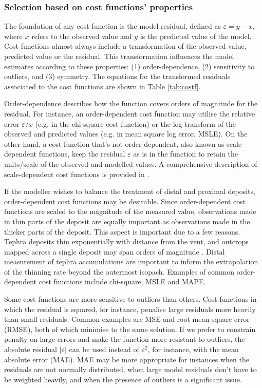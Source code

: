 \subsubsection{Selection based on cost functions' properties} \label{subsection-met-prop}

    The foundation of any cost function is the model residual, defined as $\varepsilon = y - x$, where $x$ refers to the observed value and $y$ is the predicted value of the model. Cost functions almost always include a transformation of the observed value, predicted value or the residual. This transformation influences the model estimates according to these properties: (1) order-dependence, (2) sensitivity to outliers, and (3) symmetry. The equations for the transformed residuals associated to the cost functions are shown in Table \ref{tab:costf}.
    
    Order-dependence describes how the function covers orders of magnitude for the residual. For instance, an order-dependent cost function may utilise the relative error $\varepsilon / x$ (e.g. in the chi-square cost function) or the log-transform of the observed and predicted values (e.g. in mean square log error, MSLE). On the other hand, a cost function that's not order-dependent, also known as scale-dependent functions, keep the residual $\varepsilon$ as is in the function to retain the units/scale of the observed and modelled values. A comprehensive description of scale-dependent cost functions is provided in \cite{walther2005concepts}. 
    
    If the modeller wishes to balance the treatment of distal and proximal deposits, order-dependent cost functions may be desirable. Since order-dependent cost functions are scaled to the magnitude of the measured value, observations made in thin parts of the deposit are equally important as observations made in the thicker parts of the deposit. This aspect is important due to a few reasons. Tephra deposits thin exponentially with distance from the vent, and outcrops mapped across a single deposit may span orders of magnitude \citep{pyle1989thickness}. Distal measurement of tephra accumulations are important to inform the extrapolation of the thinning rate beyond the outermost isopach. Examples of common order-dependent cost functions include chi-square, MSLE and MAPE.
    
    Some cost functions are more sensitive to outliers than others. Cost functions in which the residual is squared, for instance, penalise large residuals more heavily than small residuals. Common examples are MSE and root-mean-square-error (RMSE), both of which minimise to the same solution. If we prefer to constrain penalty on large errors and make the function more resistant to outliers, the absolute residual $\left |\varepsilon \right |$ can be used instead of $\varepsilon^2$, for instance, with the mean absolute error (MAE). MAE may be more appropriate for instances when the residuals are not normally distributed, when large model residuals don't have to be weighted heavily, and when the presence of outliers is a significant issue. 
    
